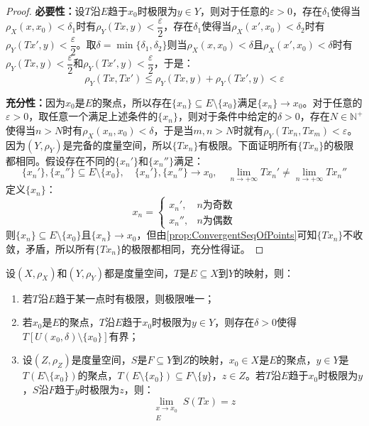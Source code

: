 \begin{proof}
	\textbf{必要性：}设$T$沿$E$趋于$x_0$时极限为$y\in Y$，则对于任意的$\varepsilon>0$，存在$\delta_1$使得当$\rho_X(x,x_0)<\delta_1$时有$\rho_Y(Tx,y)<\dfrac{\varepsilon}{2}$，存在$\delta_1$使得当$\rho_X(x',x_0)<\delta_2$时有$\rho_Y(Tx',y)<\dfrac{\varepsilon}{2}$。取$\delta=\min\{\delta_1,\delta_2\}$则当$\rho_X(x,x_0)<\delta$且$\rho_X(x',x_0)<\delta$时有$\rho_Y(Tx,y)<\dfrac{\varepsilon}{2}$和$\rho_Y(Tx',y)<\dfrac{\varepsilon}{2}$，于是：
	\begin{equation*}
		\rho_Y(Tx,Tx')\leqslant\rho_Y(Tx,y)+\rho_Y(Tx',y)<\varepsilon
	\end{equation*}\par
	\textbf{充分性：}因为$x_0$是$E$的聚点，所以存在$\{x_n\}\subseteq E\setminus\{x_0\}$满足$\{x_n\}\to x_0$。对于任意的$\varepsilon>0$，取任意一个满足上述条件的$\{x_n\}$，则对于条件中给定的$\delta>0$，存在$N\in\mathbb{N}^+$使得当$n>N$时有$\rho_X(x_n,x_0)<\delta$，于是当$m,n>N$时就有$\rho_Y(Tx_n,Tx_m)<\varepsilon$。因为$(Y,\rho_Y)$是完备的度量空间，所以$\{Tx_n\}$有极限。下面证明所有$\{Tx_n\}$的极限都相同。假设存在不同的$\{x_n'\}$和$\{x_n''\}$满足：
	\begin{equation*}
		\{x_n'\},\{x_n''\}\subseteq E\setminus\{x_0\},\quad\{x_n'\},\{x_n''\}\to x_0,\quad\lim_{n\to+\infty}Tx_n'\ne\lim_{n\to+\infty}Tx_n''
	\end{equation*}
	定义$\{x_n\}$：
	\begin{equation*}
		x_n=
		\begin{cases}
			x_n',&n\text{为奇数} \\
			x_n'',&n\text{为偶数}
		\end{cases}
	\end{equation*}
	则$\{x_n\}\subseteq E\setminus\{x_0\}$且$\{x_n\}\to x_0$，但由\cref{prop:ConvergentSeqOfPoints}可知$\{Tx_n\}$不收敛，矛盾，所以所有$\{Tx_n\}$的极限都相同，充分性得证。
\end{proof}
\begin{property}\label{prop:MappingLimits}
	设$(X,\rho_X)$和$(Y,\rho_Y)$都是度量空间，$T$是$E\subseteq X$到$Y$的映射，则：
	\begin{enumerate}
		\item 若$T$沿$E$趋于某一点时有极限，则极限唯一；
		\item 若$x_0$是$E$的聚点，$T$沿$E$趋于$x_0$时极限为$y\in Y$，则存在$\delta>0$使得$T[U(x_0,\delta)\setminus\{x_0\}]$有界；
		\item 设$(Z,\rho_Z)$是度量空间，$S$是$F\subseteq Y$到$Z$的映射，$x_0\in X$是$E$的聚点，$y\in Y$是$T(E\setminus\{x_0\})$的聚点，$T(E\setminus\{x_0\})\subseteq F\setminus\{y\}$，$z\in Z$。若$T$沿$E$趋于$x_0$时极限为$y$，$S$沿$F$趋于$y$时极限为$z$，则：
		\begin{equation*}
			\lim_{\substack{x\to x_0 \\ E}}S(Tx)=z
		\end{equation*}
	\end{enumerate}
\end{property}
